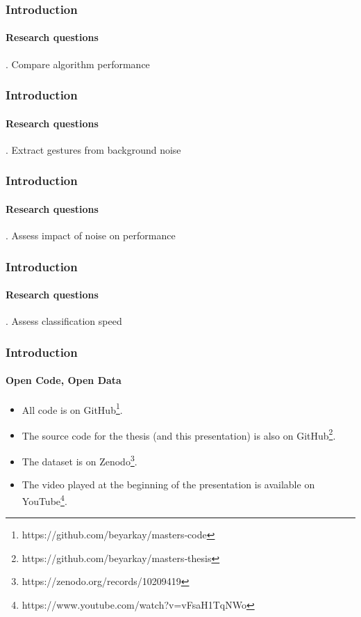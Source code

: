 \documentclass[xcolor={svgnames,table},10pt,fleqn]{beamer}
\begin{document}
\begin{frame}
    \frametitle{Introduction}
    \framesubtitle{Research questions}
    . Compare algorithm performance
\end{frame}

\begin{frame}
    \frametitle{Introduction}
    \framesubtitle{Research questions}
    . Extract gestures from background noise
\end{frame}

\begin{frame}
    \frametitle{Introduction}
    \framesubtitle{Research questions}
    . Assess impact of noise on performance
\end{frame}

\begin{frame}
    \frametitle{Introduction}
    \framesubtitle{Research questions}
    . Assess classification speed
\end{frame}

\begin{frame}
    \frametitle{Introduction}
    \framesubtitle{Open Code, Open Data}
    \begin{itemize}
        \item All code is on
            GitHub\footnote{https://github.com/beyarkay/masters‐code}.
        \item The source code for the thesis (and this presentation) is also on
            GitHub\footnote{https://github.com/beyarkay/masters‐thesis}.
        \item The dataset is on
            Zenodo\footnote{https://zenodo.org/records/10209419}.
        \item The video played at the beginning of the presentation is
            available on
            YouTube\footnote{https://www.youtube.com/watch?v=vFsaH1TqNWo}.
    \end{itemize}
\end{frame}
\end{document}

